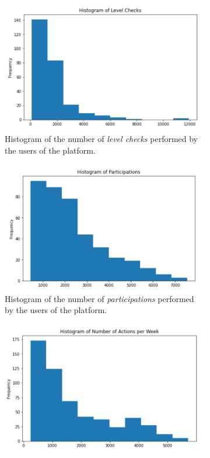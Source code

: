 \documentclass[sigplan,screen]{acmart}
\begin{document}
\begin{figure}
     \centering
     \begin{subfigure}[b]{\linewidth}
         \centering
         \includegraphics[width=0.82\linewidth]{reports/figures/histogram_level_checks.png}
         \caption{Histogram of the number of \emph{level checks} performed by the users of the platform.}
         \label{fig:level_cheks}
     \end{subfigure}
     \hfill
     \begin{subfigure}[b]{\linewidth}
         \centering
         \includegraphics[width=0.82\linewidth]{reports/figures/histogram_num_participations.png}
         \caption{Histogram of the number of \emph{participations} performed by the users of the platform.}
         \label{fig:participations}
     \end{subfigure}
     \medskip
     \begin{subfigure}[b]{\linewidth}
         \centering
         \includegraphics[width=0.82\linewidth]{reports/figures/histogram_number_of_actions_per_week.png}

\end{subfigure}
\end{figure}
\end{document}
